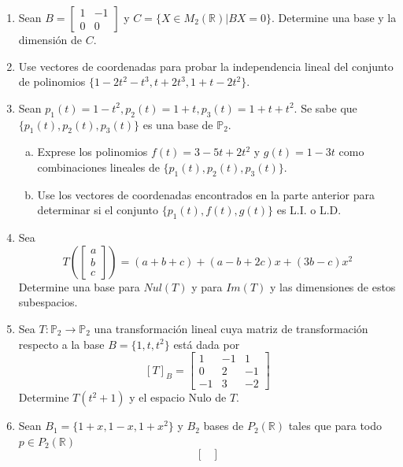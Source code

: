 \documentclass[12pt]{article}
\newenvironment{preguntas}
{\begin{enumerate}\itemsep12pt
	}
	{
	\end{enumerate}
}
\newcommand{\ra}{\rightarrow}
\newcommand{\R}{\mathbb{R}}
\begin{document}
\begin{preguntas}
$$\begin{pmatrix}
	\end{pmatrix}$$
\begin{enumerate}[a)]
\item Determine las dimensiones de $Col(A)$, de $Fila(A)$ y de $Nul(A^T)$
\item Determine, en los casos que sea posible, bases para los espacios $Nul(A^T)$ y $Fila(A)$.
\end{enumerate}
\item Sean $B = \begin{bmatrix} 1 & -1 \\ 0 & 0 \end{bmatrix}$ y $C = \{X \in M_2(\R)|BX=0\}$. Determine una base y la dimensión de $C$.
\item Use vectores de coordenadas para probar la independencia lineal del conjunto de polinomios $\{1-2t^2-t^3,t+2t^3,1+t-2t^2\}$.
\item Sean $p_1(t) = 1-t^2, p_2(t) = 1+t, p_3(t) = 1+t+t^2$. Se sabe que $\{p_1(t), p_2(t), p_3(t)\}$ es una base de $\mathbb{P}_2$.
\begin{enumerate}[a)]
\item Exprese los polinomios $f(t) = 3-5t + 2t^2$ y $g(t) = 1-3t$ como combinaciones lineales de $\{p_1(t), p_2(t), p_3(t)\}$.
\item Use los vectores de coordenadas encontrados en la parte anterior para determinar si el conjunto $\{p_1(t), f(t), g(t)\}$ es L.I. o L.D.
\end{enumerate}
\item Sea
$$T\left(\left[ \begin{array}{c}
a\\ b\\ c \end{array} \right] \right) = (a+b+c) + (a-b+2c)x +
(3b-c)x^2
$$
Determine una base para $Nul(T) $ y para $Im (T) $ y las dimensiones de estos subespacios.
\item Sea $T: \mathbb{P}_2 \ra \mathbb{P}_2$ una transformación lineal cuya matriz de transformación respecto a la base $B = \{1, t, t^2\}$ está dada por
$$[T]_B = \begin{bmatrix}
1 & -1 & 1\\
0 & 2 & -1\\
-1 & 3 & -2
\end{bmatrix}$$
Determine $T(t^2+1)$ y el espacio Nulo de $T$.
\item Sean $B_1 = \{1+x,1-x,1+x^2\}$ y $B_2$ bases de $P_2(\R)$ tales que para todo $p \in P_2(\R)$
	$$ \begin{bmatrix}

\end{bmatrix}$$
\end{preguntas}
\end{document}
